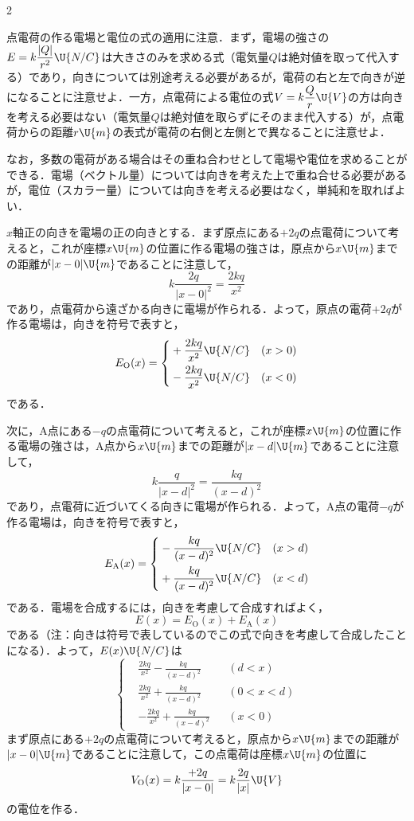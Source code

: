 \begin{multicols}{2}
\par\nopagebreak
\begin{sisin}
点電荷の作る電場と電位の式の適用に注意．まず，電場の強さの$E=k\dfrac{|Q|}{r^2}\U{N/C}$は大きさのみを求める式（電気量$Q$は絶対値を取って代入する）であり，向きについては別途考える必要があるが，{\gtfamily 電荷の右と左で向きが逆になる}ことに注意せよ．一方，点電荷による電位の式$V=k\dfrac{Q}{r}\U{V}$の方は向きを考える必要はない（電気量$Q$は絶対値を取らずにそのまま代入する）が，点電荷からの距離$r\U{m}$の表式が電荷の右側と左側とで異なることに注意せよ．

なお，多数の電荷がある場合はその重ね合わせとして電場や電位を求めることができる．電場（ベクトル量）については向きを考えた上で重ね合せる必要があるが，電位（スカラー量）については向きを考える必要はなく，単純和を取ればよい．
\end{sisin}
\KaiHead
\begin{komon}
 $x$軸正の向きを電場の正の向きとする．まず原点にある$+2q$の点電荷について考えると，これが座標$x\U{m}$の位置に作る電場の強さは，原点から$x\U{m}$までの距離が$|x-0|\U{m}$であることに注意して，
       \[k\frac{2q}{|x-0|^2}=\frac{2kq}{x^2}\]
       であり，点電荷から遠ざかる向きに電場が作られる．よって，原点の電荷$+2q$が作る電場は，向きを符号で表すと，
       \[E_{\mathrm{O}}(x)=\left\{\begin{aligned}
         &+\frac{2kq}{x^2}\U{N/C}&&(x>0)\\
         &-\frac{2kq}{x^2}\U{N/C}&&(x<0)
       \end{aligned}\right.\]
       である．

       次に，$\mathrm{A}$点にある$-q$の点電荷について考えると，これが座標$x\U{m}$の位置に作る電場の強さは，$\mathrm{A}$点から$x\U{m}$までの距離が$|x-d|\U{m}$であることに注意して，
       \[k\frac{q}{|x-d|^2}=\frac{kq}{(x-d)^2}\]
       であり，点電荷に近づいてくる向きに電場が作られる．よって，$\mathrm{A}$点の電荷$-q$が作る電場は，向きを符号で表すと，
       \[E_{\mathrm{A}}(x)=\left\{\begin{aligned}
         &-\frac{kq}{(x-d)^2}\U{N/C}&&(x>d)\\
         &+\frac{kq}{(x-d)^2}\U{N/C}&&(x<d)
       \end{aligned}\right.\]
       である．電場を合成するには，向きを考慮して合成すればよく，
       \[E(x)=E_{\mathrm{O}}(x)+E_{\mathrm{A}}(x)\]
       である（注：向きは符号で表しているのでこの式で向きを考慮して合成したことになる）．よって，$E(x)\U{N/C}$は
       \[\left\{\begin{aligned}
         &\frac{2kq}{x^2}-\frac{kq}{(x-d)^2}&&(d<x)\\
         &\frac{2kq}{x^2}+\frac{kq}{(x-d)^2}&&(0<x<d)\\
         &-\frac{2kq}{x^2}+\frac{kq}{(x-d)^2}&&(x<0)
       \end{aligned}\right.\]
       \hspace*{\fill}\Ans
{} まず原点にある$+2q$の点電荷について考えると，原点から$x\U{m}$までの距離が$|x-0|\U{m}$であることに注意して，この点電荷は座標$x\U{m}$の位置に
       \[V_{\mathrm{O}}(x)=k\frac{+2q}{|x-0|}=k\frac{2q}{|x|}\U{V}\]
       の電位を作る．


\end{komon}
\end{multicols}
